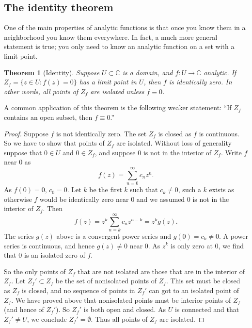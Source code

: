 \documentclass[12pt,openany]{book}
\newcommand{\C}{{\mathbb{C}}}
\theoremstyle{plain}
\newtheorem{thm}{Theorem}[section]
\theoremstyle{remark}
\theoremstyle{definition}
\theoremstyle{exercise}
\theoremstyle{example}
\begin{document}
\subsection{The identity theorem}

One of the main properties of analytic functions is that once you know them
in a neighborhood you know them everywhere.  In fact, a much more general
statement is true; you only need to know an analytic function on a set with
a limit point.

\begin{thm}[Identity]%
\label{thm:identity}
Suppose $U \subset \C$ is a domain, 
and $f \colon U \to \C$ analytic.
If $Z_f = \bigl\{ z \in U : f(z) = 0 \bigr\}$
has a limit point in $U$, then $f$ is identically zero.
In other words, all points of $Z_f$ are isolated unless $f \equiv 0$.
\end{thm}

A common application of this theorem is the following weaker statement: ``If $Z_f$
contains an open subset, then $f \equiv 0$.''

\begin{proof}
Suppose $f$ is not identically zero.
The set $Z_f$ is closed as $f$ is continuous.  So we have to show
that points of $Z_f$ are isolated.
Without loss of generality suppose that $0 \in U$ and $0 \in Z_f$,
and suppose $0$ is not in the interior of $Z_f$.
Write $f$ near $0$ as
\begin{equation*}
f(z) = \sum_{n=0}^\infty c_n z^n .
\end{equation*}
As $f(0) = 0$, $c_0 =0$.  Let $k$ be the first $k$ such that $c_k \not=0$,
such a $k$ exists as otherwise $f$ would be identically zero near $0$
and we assumed $0$ is not in the interior of $Z_f$.  Then
\begin{equation*}
f(z) = z^k \sum_{n=k}^\infty c_n z^{n-k} = z^k g(z) .
\end{equation*}
The series $g(z)$ above is a convergent power series and $g(0) = c_k \not=
0$.  A power series is continuous, and hence $g(z) \not= 0$ near $0$.
As $z^k$ is only zero at $0$, we find that $0$ is an isolated zero of $f$.

So the only points of $Z_f$ that are not isolated are those that are in the
interior of $Z_f$.  Let $Z_f' \subset Z_f$ be the set of nonisolated points
of $Z_f$.  This set must be closed as $Z_f$ is closed, and no sequence
of points in $Z_f'$ can
got to an isolated point of $Z_f$.  We have proved above that nonisolated
points must be interior points of $Z_f$ (and hence of $Z_f'$).
So $Z_f'$ is both open and closed.  As $U$ is connected and 
that $Z_f' \not= U$, we conclude $Z_f' = \emptyset$.
Thus all points of $Z_f$ are isolated.
\end{proof}
\end{document}
